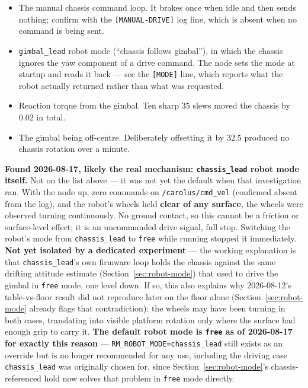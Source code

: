 \documentclass[11pt]{report}
\newenvironment{warningbox}%
  {\begin{lrbox}{\warnbox}\begin{minipage}{0.90\textwidth}}%
  {\end{minipage}\end{lrbox}%
   \begin{center}\fcolorbox{black}{codebg}{\usebox{\warnbox}}\end{center}}
\begin{document}
\begin{itemize}
  \item The manual chassis command loop. It brakes once when idle and then
  sends nothing; confirm with the \texttt{[MANUAL-DRIVE]} log line, which is
  absent when no command is being sent.
  \item \texttt{gimbal\_lead} robot mode (``chassis follows gimbal''), in which
  the chassis ignores the yaw component of a drive command. The node sets the
  mode at startup and reads it back --- see the \texttt{[MODE]} line, which
  reports what the robot actually returned rather than what was requested.
  \item Reaction torque from the gimbal. Ten sharp $35$\textdegree{} slews moved
  the chassis by $0.02$\textdegree{} in total.
  \item The gimbal being off-centre. Deliberately offsetting it by
  $32.5$\textdegree{} produced no chassis rotation over a minute.
\end{itemize}

\begin{warningbox}
\textbf{Found 2026-08-17, likely the real mechanism: \texttt{chassis\_lead}
robot mode itself.} Not on the list above --- it was not yet the default when
that investigation ran. With the node up, zero commands on
\texttt{/carolus/cmd\_vel} (confirmed absent from the log), and the robot's
wheels held \textbf{clear of any surface}, the wheels were observed turning
continuously. No ground contact, so this cannot be a friction or
surface-level effect; it is an uncommanded drive signal, full stop. Switching
the robot's mode from \texttt{chassis\_lead} to \texttt{free} while running
stopped it immediately. \textbf{Not yet isolated by a dedicated experiment}
--- the working explanation is that \texttt{chassis\_lead}'s own firmware
loop holds the chassis against the same drifting attitude estimate
(Section~\ref{sec:robot-mode}) that used to drive the gimbal in \texttt{free}
mode, one level down. If so, this also explains why 2026-08-12's table-vs-floor
result did not reproduce later on the floor alone (Section~\ref{sec:robot-mode}
already flags that contradiction): the wheels may have been turning in both
cases, translating into visible platform rotation only where the surface had
enough grip to carry it. \textbf{The default robot mode is \texttt{free} as of
2026-08-17 for exactly this reason} --- \texttt{RM\_ROBOT\_MODE=chassis\_lead}
still exists as an override but is no longer recommended for any use,
including the driving case \texttt{chassis\_lead} was originally chosen for,
since Section~\ref{sec:robot-mode}'s chassis-referenced hold now solves that
problem in \texttt{free} mode directly.
\end{warningbox}
\end{document}
